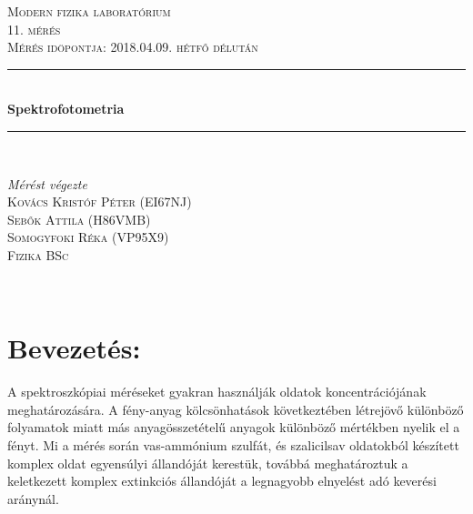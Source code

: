 \documentclass[20pt]{article}
\numberwithin{equation}{section}
\numberwithin{figure}{section}
\numberwithin{table}{section}
\begin{document}
	\begin{titlepage}
		
		\newcommand{\HRule}{\rule{\linewidth}{0.5mm}}
		\center
		
		\textsc{\LARGE Modern fizika laboratórium}\\[1.5cm]
		\textsc{\Large 11. mérés}\\[1cm]
		\textsc{\large Mérés idöpontja: 2018.04.09. hétfő délután}\\[0.5cm]
		
		\HRule\\[0.4cm]
		
		{\huge\bfseries Spektrofotometria }\\[0.4cm]
		
		\HRule\\[1.5cm]
		
		\begin{minipage}{0.5\textwidth}
			\begin{flushleft}
				\large
				\textit{Mérést végezte}\\
				\textsc{Kovács Kristóf Péter (EI67NJ)}\\
				\textsc{Sebők Attila (H86VMB)}\\
				\textsc{Somogyfoki Réka (VP95X9)}\\
				\textsc{Fizika BSc}\\
			\end{flushleft}
		\end{minipage}
		~
		\begin{minipage}{0.4\textwidth}
			\begin{flushright}
				\large
			\end{flushright}
		\end{minipage}
		
		\vfill
	\end{titlepage}
	
	\section{Bevezetés:}
	A spektroszkópiai méréseket gyakran használják oldatok koncentrációjának meghatározására. A fény-anyag kölcsönhatások következtében létrejövő különböző folyamatok miatt más anyagösszetételű anyagok különböző mértékben nyelik el a fényt. Mi a mérés során vas-ammónium szulfát, és szalicilsav oldatokból készített komplex oldat egyensúlyi állandóját kerestük, továbbá meghatároztuk a keletkezett komplex extinkciós állandóját a legnagyobb elnyelést adó keverési aránynál.
	
\end{document}
